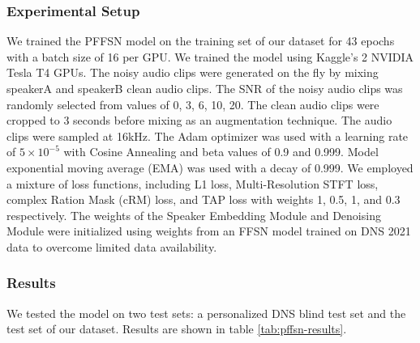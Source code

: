 \subsubsection{Experimental Setup}

We trained the PFFSN model on the training set of our dataset for 43 epochs with a batch size of 16 per GPU. We trained the model using Kaggle's 2 NVIDIA Tesla T4 GPUs.
The noisy audio clips were generated on the fly by mixing speakerA and speakerB clean audio clips. The SNR of the noisy audio clips was randomly selected from values of 0, 3, 6, 10, 20.
The clean audio clips were cropped to 3 seconds before mixing as an augmentation technique. The audio clips were sampled at 16kHz.
The Adam optimizer was used with a learning rate of $5 \times 10^{-5}$ with Cosine Annealing and beta values of 0.9 and 0.999. Model exponential moving average (EMA) was used with a decay of 0.999.
We employed a mixture of loss functions, including L1 loss, Multi-Resolution STFT loss, complex Ration Mask (cRM) loss, and TAP loss with weights 1, 0.5, 1, and 0.3 respectively.
The weights of the Speaker Embedding Module and Denoising Module were initialized using weights from an FFSN model trained on DNS 2021 data to overcome limited data availability.

\subsubsection{Results}
We tested the model on two test sets: a personalized DNS blind test set and the test set of our dataset. Results are shown in table \ref{tab:pffsn-results}.

